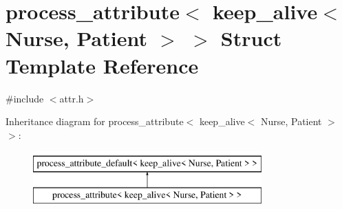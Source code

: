 \hypertarget{structprocess__attribute_3_01keep__alive_3_01_nurse_00_01_patient_01_4_01_4}{}\section{process\+\_\+attribute$<$ keep\+\_\+alive$<$ Nurse, Patient $>$ $>$ Struct Template Reference}
\label{structprocess__attribute_3_01keep__alive_3_01_nurse_00_01_patient_01_4_01_4}


{\ttfamily \#include $<$attr.\+h$>$}

Inheritance diagram for process\+\_\+attribute$<$ keep\+\_\+alive$<$ Nurse, Patient $>$ $>$\+:\begin{figure}[H]
\begin{center}
\leavevmode
\includegraphics[height=2.000000cm]{structprocess__attribute_3_01keep__alive_3_01_nurse_00_01_patient_01_4_01_4}
\end{center}
\end{figure}
